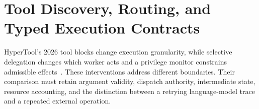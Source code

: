 \chapter{Tool Discovery, Routing, and Typed Execution Contracts}\label{ch:C18}

HyperTool's 2026 tool blocks change execution granularity, while selective delegation changes which worker acts and a privilege monitor constrains admissible effects~\cite{du2026hypertool,cui2026unoorchestra,corpus250411703}. These interventions address different boundaries. Their comparison must retain argument validity, dispatch authority, intermediate state, resource accounting, and the distinction between a retrying language-model trace and a repeated external operation.










